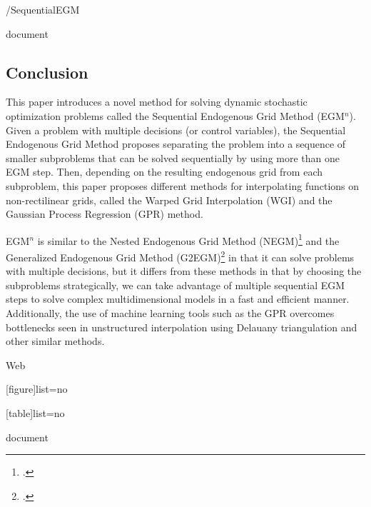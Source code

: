 \documentclass{article}
\title{}
\date{\displaydate{articleDate}}
\author{}
\begin{document}
\maketitle
\keywords{}/SequentialEGM

document

\subsection{Conclusion}\label{sec:conclusion}

This paper introduces a novel method for solving dynamic stochastic optimization problems called the Sequential Endogenous Grid Method (EGM$^n$). Given a problem with multiple decisions (or control variables), the Sequential Endogenous Grid Method proposes separating the problem into a sequence of smaller subproblems that can be solved sequentially by using more than one EGM step. Then, depending on the resulting endogenous grid from each subproblem, this paper proposes different methods for interpolating functions on non-rectilinear grids, called the Warped Grid Interpolation (WGI) and the Gaussian Process Regression (GPR) method.

EGM$^n$ is similar to the Nested Endogenous Grid Method (NEGM)\footnote{\citet{Druedahl2021}.} and the Generalized Endogenous Grid Method (G2EGM)\footnote{\citet{Druedahl2017}.} in that it can solve problems with multiple decisions, but it differs from these methods in that by choosing the subproblems strategically, we can take advantage of multiple sequential EGM steps to solve complex multidimensional models in a fast and efficient manner. Additionally, the use of machine learning tools such as the GPR overcomes bottlenecks seen in unstructured interpolation using Delauany triangulation and other similar methods.

Web

[figure]list=no

[table]list=no

document

\clearpage

\end{document}
